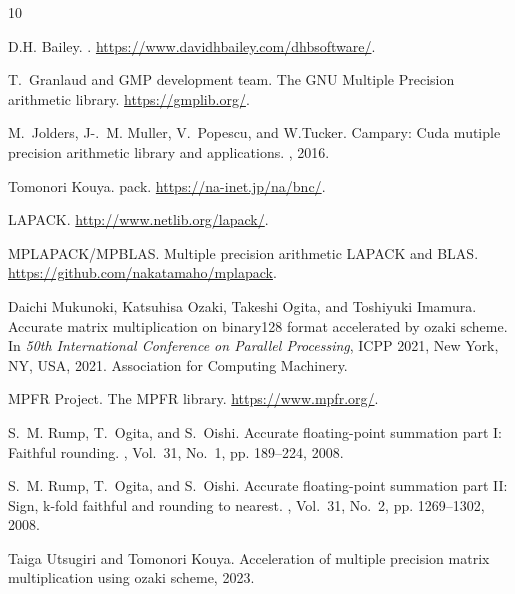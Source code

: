 \documentclass[a4j,report]{jsbook}
\begin{document}
%
%
\begin{thebibliography}{10}

    D.H. Bailey.
    .
    \newblock \url{https://www.davidhbailey.com/dhbsoftware/}.
    
    T.~Granlaud and {GMP} development team.
    \newblock The {GNU} {M}ultiple {P}recision arithmetic library.
    \newblock \url{https://gmplib.org/}.
    
    M.~Jolders, J-.~M. {Muller}, V.~Popescu, and W.Tucker.
    \newblock Campary: Cuda mutiple precision arithmetic library and applications.
    , 2016.
    
    Tomonori Kouya.
    pack.
    \newblock \url{https://na-inet.jp/na/bnc/}.
    
    LAPACK.
    \newblock \url{http://www.netlib.org/lapack/}.
    
    MPLAPACK/MPBLAS.
    \newblock Multiple precision arithmetic {LAPACK} and {BLAS}.
    \newblock \url{https://github.com/nakatamaho/mplapack}.
    
    Daichi Mukunoki, Katsuhisa Ozaki, Takeshi Ogita, and Toshiyuki Imamura.
    \newblock Accurate matrix multiplication on binary128 format accelerated by
      ozaki scheme.
    \newblock In {\em 50th International Conference on Parallel Processing}, ICPP
      2021, New York, NY, USA, 2021. Association for Computing Machinery.
    
    {MPFR} Project.
    \newblock The {MPFR} library.
    \newblock \url{https://www.mpfr.org/}.
    
    S.~M. Rump, T.~Ogita, and S.~Oishi.
    \newblock Accurate floating-point summation part {I}: Faithful rounding.
    , Vol.~31, No.~1, pp.
      189--224, 2008.
    
    S.~M. Rump, T.~Ogita, and S.~Oishi.
    \newblock Accurate floating-point summation part {II}: Sign, k-fold faithful
      and rounding to nearest.
    , Vol.~31, No.~2, pp.
      1269--1302, 2008.
    
    Taiga Utsugiri and Tomonori Kouya.
    \newblock Acceleration of multiple precision matrix multiplication using ozaki
      scheme, 2023.
    
\end{thebibliography}
    

\backmatter

\printindex

\end{document}
